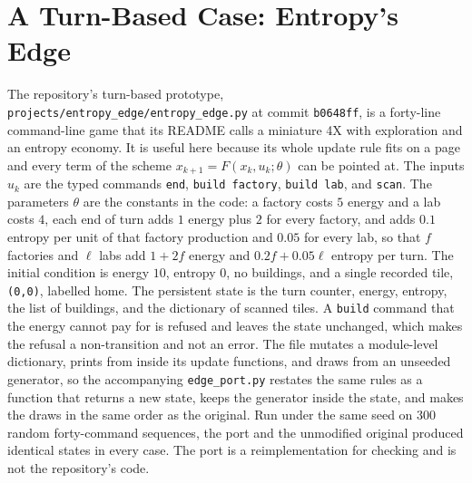 \section{A Turn-Based Case: Entropy's Edge}

The repository's turn-based prototype, \texttt{projects/entropy\_edge/entropy\_edge.py} at commit \texttt{b0648ff}, is a forty-line command-line game that its README calls a miniature 4X with exploration and an entropy economy. It is useful here because its whole update rule fits on a page and every term of the scheme $x_{k+1}=F(x_k,u_k;\theta)$ can be pointed at. The inputs $u_k$ are the typed commands \texttt{end}, \texttt{build factory}, \texttt{build lab}, and \texttt{scan}. The parameters $\theta$ are the constants in the code: a factory costs $5$ energy and a lab costs $4$, each end of turn adds $1$ energy plus $2$ for every factory, and adds $0.1$ entropy per unit of that factory production and $0.05$ for every lab, so that $f$ factories and $\ell$ labs add $1+2f$ energy and $0.2f+0.05\ell$ entropy per turn. The initial condition is energy $10$, entropy $0$, no buildings, and a single recorded tile, \texttt{(0,0)}, labelled home. The persistent state is the turn counter, energy, entropy, the list of buildings, and the dictionary of scanned tiles. A \texttt{build} command that the energy cannot pay for is refused and leaves the state unchanged, which makes the refusal a non-transition and not an error. The file mutates a module-level dictionary, prints from inside its update functions, and draws from an unseeded generator, so the accompanying \texttt{edge\_port.py} restates the same rules as a function that returns a new state, keeps the generator inside the state, and makes the draws in the same order as the original. Run under the same seed on $300$ random forty-command sequences, the port and the unmodified original produced identical states in every case. The port is a reimplementation for checking and is not the repository's code.



